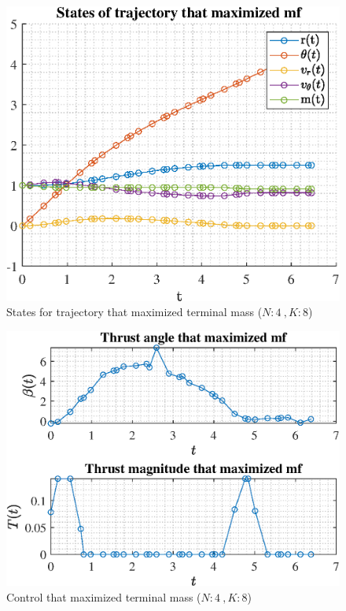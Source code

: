 \documentclass[]{article}
\begin{document}
	\begin{figure}
		\centering
		\includegraphics[scale=0.75]{states_N4_K8_C3_mf.eps}
		\caption{States for trajectory that maximized terminal mass (\(N:4\ , K:8\))}
		\label{fig:states_N4_K8_C3_mf}
	\end{figure}
	\begin{figure}
		\centering
		\includegraphics[scale=0.75]{control_N4_K8_C3_mf.eps}
		\caption{Control that maximized terminal mass (\(N:4\ , K:8\))}
		\label{fig:control_N4_K8_C3_mf}
	\end{figure}
\end{document}
